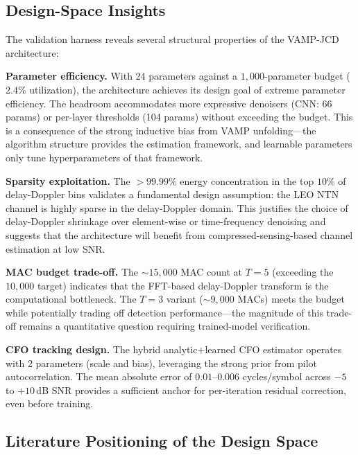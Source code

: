 \documentclass{article}
\begin{document}
\subsection{Design-Space Insights}

The validation harness reveals several structural properties of the VAMP-JCD architecture:

\textbf{Parameter efficiency.} With 24 parameters against a $1{,}000$-parameter budget ($2.4\%$ utilization), the architecture achieves its design goal of extreme parameter efficiency. The headroom accommodates more expressive denoisers (CNN: 66 params) or per-layer thresholds (104 params) without exceeding the budget. This is a consequence of the strong inductive bias from VAMP unfolding---the algorithm structure provides the estimation framework, and learnable parameters only tune hyperparameters of that framework.

\textbf{Sparsity exploitation.} The $> 99.99\%$ energy concentration in the top $10\%$ of delay-Doppler bins validates a fundamental design assumption: the LEO NTN channel is highly sparse in the delay-Doppler domain. This justifies the choice of delay-Doppler shrinkage over element-wise or time-frequency denoising and suggests that the architecture will benefit from compressed-sensing-based channel estimation at low SNR.

\textbf{MAC budget trade-off.} The $\sim 15{,}000$ MAC count at $T=5$ (exceeding the $10{,}000$ target) indicates that the FFT-based delay-Doppler transform is the computational bottleneck. The $T=3$ variant ($\sim 9{,}000$ MACs) meets the budget while potentially trading off detection performance---the magnitude of this trade-off remains a quantitative question requiring trained-model verification.

\textbf{CFO tracking design.} The hybrid analytic+learned CFO estimator operates with 2 parameters (scale and bias), leveraging the strong prior from pilot autocorrelation. The mean absolute error of $0.01$--$0.006$ cycles/symbol across $-5$ to $+10$\,dB SNR provides a sufficient anchor for per-iteration residual correction, even before training.

\subsection{Literature Positioning of the Design Space}
\end{document}
